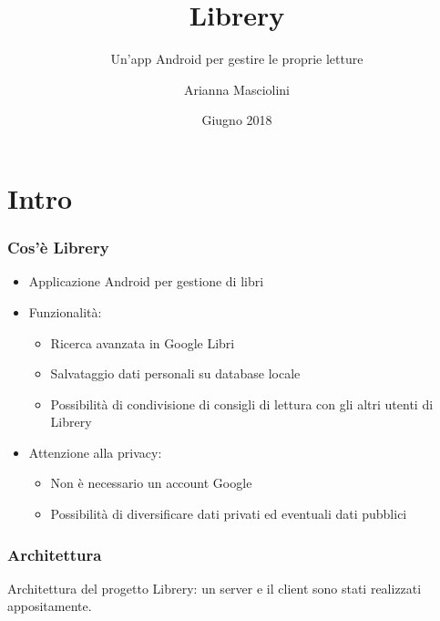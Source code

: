 \documentclass{beamer}
\title{Libre\textcolor{ProgBarBGColor}{ry}}
\subtitle{Un'app Android per gestire le proprie letture}
\author{Arianna Masciolini}
\institute{Università degli Studi di Perugia}
\date{Giugno 2018}
\begin{document}
	\setcounter{showProgressBar}{0}
	\setcounter{showSlideNumbers}{0}
	\frame{\titlepage}
	\setcounter{framenumber}{0}
	\setcounter{showProgressBar}{1}
	\setcounter{showSlideNumbers}{1}
	\section{Intro}
	\begin{frame}
		\frametitle{Cos'è Librery}
		\begin{itemize}
			\item Applicazione Android per gestione di libri
			\item Funzionalità:
			\begin{itemize}
				\item Ricerca avanzata in Google Libri
				\item Salvataggio dati personali su database locale
				\item Possibilità di condivisione di consigli di lettura con gli altri utenti di Librery
			\end{itemize}
		\item Attenzione alla privacy: 
		\begin{itemize}
			\item Non è necessario un account Google
			\item Possibilità di diversificare dati privati ed eventuali dati pubblici
		\end{itemize}
		\end{itemize}
	\end{frame}
	\begin{frame}
		\frametitle{Architettura}
		Architettura del progetto Librery: un server e il client sono stati realizzati appositamente.
	\end{frame}
\end{document}
